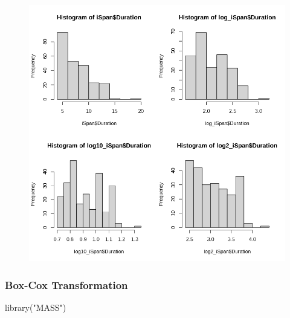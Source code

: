 \documentclass[
  letterpaper,
  DIV=11,
  numbers=noendperiod]{scrartcl}
\newenvironment{Shaded}{\begin{snugshade}}{\end{snugshade}}
\newcommand{\CommentTok}[1]{\textcolor[rgb]{0.37,0.37,0.37}{#1}}
\newcommand{\DecValTok}[1]{\textcolor[rgb]{0.68,0.00,0.00}{#1}}
\newcommand{\FunctionTok}[1]{\textcolor[rgb]{0.28,0.35,0.67}{#1}}
\newcommand{\NormalTok}[1]{\textcolor[rgb]{0.00,0.23,0.31}{#1}}
\newcommand{\OtherTok}[1]{\textcolor[rgb]{0.00,0.23,0.31}{#1}}
\newcommand{\SpecialCharTok}[1]{\textcolor[rgb]{0.37,0.37,0.37}{#1}}
\newcommand{\StringTok}[1]{\textcolor[rgb]{0.13,0.47,0.30}{#1}}
\begin{document}
\begin{figure}[H]

{\centering \includegraphics{dss-span-analysis-rev5_files/figure-pdf/cell-64-output-1.png}

}

\end{figure}

\hypertarget{box-cox-transformation-1}{%
\subsubsection{Box-Cox Transformation}\label{box-cox-transformation-1}}

\begin{Shaded}
\begin{Highlighting}[]
\FunctionTok{library}\NormalTok{(}\StringTok{"MASS"}\NormalTok{)}
\end{Highlighting}
\end{Shaded}

\begin{Shaded}
\end{Shaded}
\end{document}

